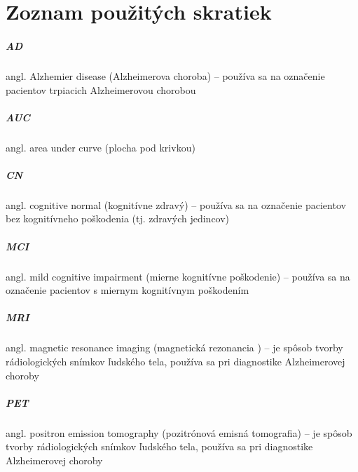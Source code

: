 \chapter*{Zoznam použitých skratiek}

\paragraph{AD} angl. Alzhemier disease (Alzheimerova choroba) -- používa sa na označenie pacientov trpiacich Alzheimerovou chorobou
\paragraph{AUC} angl. area under curve (plocha pod krivkou)
\paragraph{CN} angl. cognitive normal (kognitívne zdravý) -- používa sa na označenie pacientov bez kognitívneho poškodenia (tj. zdravých jedincov)
\paragraph{MCI} angl. mild cognitive impairment (mierne kognitívne poškodenie) -- používa sa na označenie pacientov s miernym kognitívnym poškodením
\paragraph{MRI} angl. magnetic resonance imaging  (magnetická rezonancia ) -- je spôsob tvorby rádiologických snímkov ľudského tela, používa sa pri diagnostike Alzheimerovej choroby
\paragraph{PET} angl. positron emission tomography  (pozitrónová emisná tomografia) -- je spôsob tvorby rádiologických snímkov ľudského tela, používa sa pri diagnostike Alzheimerovej choroby